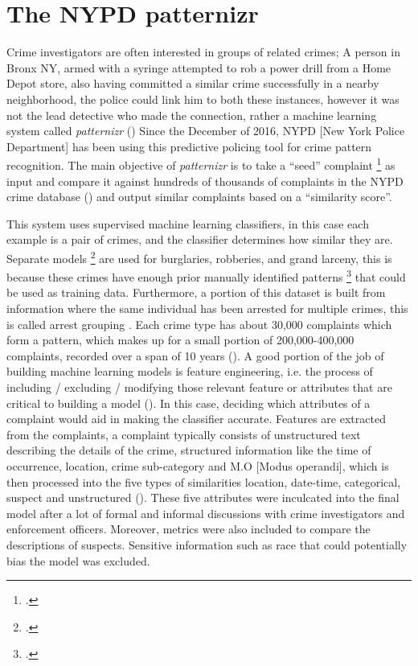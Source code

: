 \documentclass[a4paper,14pt]{extarticle}
\begin{document}
\section*{The NYPD patternizr }
\begin{justifying}

	Crime investigators are often interested in groups of related crimes; A person in Bronx NY, armed with a syringe attempted to rob a power drill from a Home Depot store, also having committed a similar crime successfully in a nearby neighborhood, the police could link him to both these instances, however it was not the lead detective who made the connection, rather a machine learning system called \textit{patternizr} (\cite{Levine2019}) Since the December of 2016, NYPD [New York Police Department] has been using this predictive policing tool for crime pattern recognition. The main objective of \textit{patternizr}  is to take a “seed” complaint  \footcite{A crime report (Chohlas-Wood & Levine, 2019)} as input and compare it against hundreds of thousands of complaints in the NYPD crime database (\cite{Levine2019}) and output similar complaints based on a “similarity score”. \vspace{1em}
	
	This system uses supervised machine learning classifiers, in this case each example is a pair of crimes, and the classifier determines how similar they are. Separate models  \footcite{An instance of the machine learning classifier.} are used for burglaries, robberies, and grand larceny, this is because these crimes have enough prior manually identified patterns  \footcite{A series of crimes committed by the same individual.} that could be used as training data. Furthermore, a portion of this dataset is built from information where the same individual has been arrested for multiple crimes, this is called arrest grouping . Each crime type has about 30,000 complaints which form a pattern, which makes up for a small portion of 200,000-400,000 complaints, recorded over a span of 10 years (\cite{Levine2019}). \vspace{1em}
	\newline A good portion of the job of building machine learning models is feature engineering, i.e. the process of including / excluding / modifying those relevant feature or attributes that are critical to building a model (\cite{Verdoc21}). In this case, deciding which attributes of a complaint would aid in making the classifier accurate. Features are extracted from the complaints, a complaint typically consists of unstructured text describing the details of the crime, structured information like the time of occurrence, location, crime sub-category and M.O [Modus operandi], which is then processed into the five types of similarities location, date-time, categorical, suspect and unstructured (\cite{Levine2019}).  \vspace{1em}
	\newline	These five attributes were inculcated into the final model after a lot of formal and informal discussions with crime investigators and enforcement officers. Moreover, metrics were also included to compare the descriptions of suspects. Sensitive information such as race that could potentially bias the model was excluded.
\end{justifying}
\end{document}
